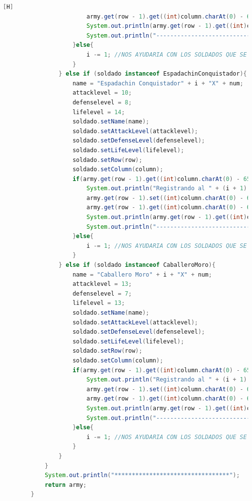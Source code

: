 \documentclass{article}
\begin{document}
\begin{lstlisting}[language=java,caption={Las lineas de codigos de la clase Mapa}][H]
						army.get(row - 1).get((int)column.charAt(0) - 65).setSpeed(speed);
						System.out.println(army.get(row - 1).get((int)column.charAt(0) - 65).toString());
						System.out.println("---------------------------------");
					}else{
						i -= 1; //NOS AYUDARIA CON LOS SOLDADOS QUE SE REPITEN EN EL MISMO CASILLERO CON TAL QUE NO DEBERIA CONTAR 
					}
				} else if (soldado instanceof EspadachinConquistador){
					name = "Espadachin Conquistador" + i + "X" + num;
					attacklevel = 10;
					defenselevel = 8;
					lifelevel = 14;
					soldado.setName(name);                  
					soldado.setAttackLevel(attacklevel);
					soldado.setDefenseLevel(defenselevel);                    
					soldado.setLifeLevel(lifelevel);
					soldado.setRow(row);
					soldado.setColumn(column);
					if(army.get(row - 1).get((int)column.charAt(0) - 65) == null){
						System.out.println("Registrando al " + (i + 1) + " soldado del Ejercito " + armyespe + "");
						army.get(row - 1).set((int)column.charAt(0) - 65, new EspadachinConquistador(name, attacklevel, defenselevel, lifelevel, speed, "Espadachin Conquistador", true, row, column, attacklevel, attacklevel));
						army.get(row - 1).get((int)column.charAt(0) - 65).setSpeed(speed);
						System.out.println(army.get(row - 1).get((int)column.charAt(0) - 65).toString());
						System.out.println("---------------------------------");
					}else{
						i -= 1; //NOS AYUDARIA CON LOS SOLDADOS QUE SE REPITEN EN EL MISMO CASILLERO CON TAL QUE NO DEBERIA CONTAR 
					}
				} else if (soldado instanceof CaballeroMoro){
					name = "Caballero Moro" + i + "X" + num;
					attacklevel = 13;
					defenselevel = 7;
					lifelevel = 13;
					soldado.setName(name);                  
					soldado.setAttackLevel(attacklevel);
					soldado.setDefenseLevel(defenselevel);                    
					soldado.setLifeLevel(lifelevel);
					soldado.setRow(row);
					soldado.setColumn(column);
					if(army.get(row - 1).get((int)column.charAt(0) - 65) == null){
						System.out.println("Registrando al " + (i + 1) + " soldado del Ejercito " + armyespe + "");
						army.get(row - 1).set((int)column.charAt(0) - 65, new CaballeroMoro(name, attacklevel, defenselevel, lifelevel, speed, "Caballero Moro", true, row, column, attacklevel, attacklevel));
						army.get(row - 1).get((int)column.charAt(0) - 65).setSpeed(speed);
						System.out.println(army.get(row - 1).get((int)column.charAt(0) - 65).toString());
						System.out.println("---------------------------------");
					}else{
						i -= 1; //NOS AYUDARIA CON LOS SOLDADOS QUE SE REPITEN EN EL MISMO CASILLERO CON TAL QUE NO DEBERIA CONTAR 
					}
				}
			}
			System.out.println("*********************************");
			return army;
		}
	\end{lstlisting}
\end{document}
